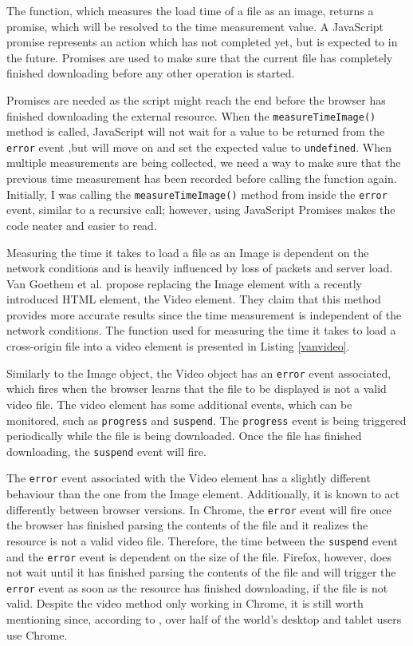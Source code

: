 \documentclass[10pt,a4paper,twoside]{book}
\begin{document}
The function, which measures the load time of a file as an image, returns a promise, which will be resolved to the time measurement value. A JavaScript promise represents an action which has not completed yet, but is expected to in the future. Promises are used to make sure that the current file has completely finished downloading before any other operation is started. 

Promises are needed as the script might reach the end before the browser has finished downloading the external resource. When the \texttt{measureTimeImage()} method is called, JavaScript will not wait for a value to be returned from the \texttt{error} event ,but will move on and set the expected value to \texttt{undefined}. When multiple measurements are being collected, we need a way to make sure that the previous time measurement has been recorded before calling the function again.  
Initially, I was calling the \texttt{measureTimeImage()} method from inside the \texttt{error} event, similar to a recursive call; however, using JavaScript Promises makes the code neater and easier to read.

Measuring the time it takes to load a file as an Image is dependent on the network conditions and is heavily influenced by loss of packets and server load. Van Goethem et al. \cite{van2015clock} propose replacing the Image element with a recently introduced HTML element, the Video element. They claim that this method provides more accurate results since the time measurement is independent of the network conditions. The function used for measuring the time it takes to load a cross-origin file into a video element is presented in Listing \ref{vanvideo}.

Similarly to the Image object, the Video object has an \texttt{error} event associated, which fires when the browser learns that the file to be displayed is not a valid video file. The video element has some additional events, which can be monitored, such as \texttt{progress} and \texttt{suspend}. The \texttt{progress} event is being triggered periodically while the file is being downloaded. Once the file has finished downloading, the \texttt{suspend} event will fire. 

The \texttt{error} event associated with the Video element has a slightly different behaviour than the one from the Image element. Additionally, it is known to act differently between browser versions. In Chrome, the \texttt{error} event will fire once the browser has finished parsing the contents of the file and it realizes the resource is not a valid video file. Therefore, the time between the \texttt{suspend} event and the \texttt{error} event is dependent on the size of the file. Firefox, however, does not wait until it has finished parsing the contents of the file and will trigger the \texttt{error} event as soon as the resource has finished downloading, if the file is not valid. Despite the video method only working in Chrome, it is still worth mentioning since, according to \cite{statcounter}, over half of the world's desktop and tablet users use Chrome.
\end{document}
